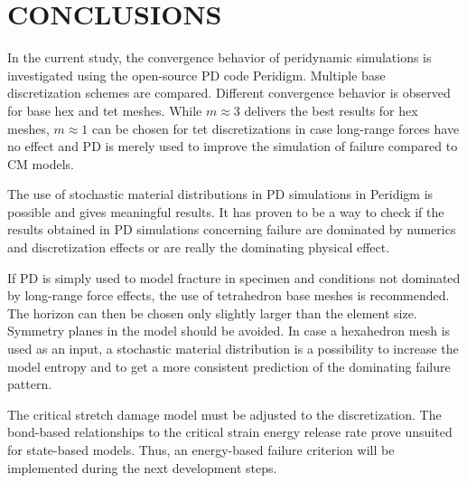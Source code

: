 \section{\protect\uppercase{Conclusions}}

In the current study, the convergence behavior of peridynamic simulations is investigated using the open-source PD code Peridigm. Multiple base discretization schemes are compared. Different convergence behavior is observed for base hex and tet meshes. While $m\approx3$ delivers the best results for hex meshes, $m\approx1$ can be chosen for tet discretizations in case long-range forces have no effect and PD is merely used to improve the simulation of failure compared to CM models.

The use of stochastic material distributions in PD simulations in Peridigm is possible and gives meaningful results. It has proven to be a way to check if the results obtained in PD simulations concerning failure are dominated by numerics and discretization effects or are really the dominating physical effect.

If PD is simply used to model fracture in specimen and conditions not dominated by long-range force effects, the use of tetrahedron base meshes is recommended. The horizon can then be chosen only slightly larger than the element size. Symmetry planes in the model should be avoided. In case a hexahedron mesh is used as an input, a stochastic material distribution is a possibility to increase the model entropy and to get a more consistent prediction of the dominating failure pattern.

The critical stretch damage model must be adjusted to the discretization. The bond-based relationships to the critical strain energy release rate prove unsuited for state-based models. Thus, an energy-based failure criterion will be implemented during the next development steps.